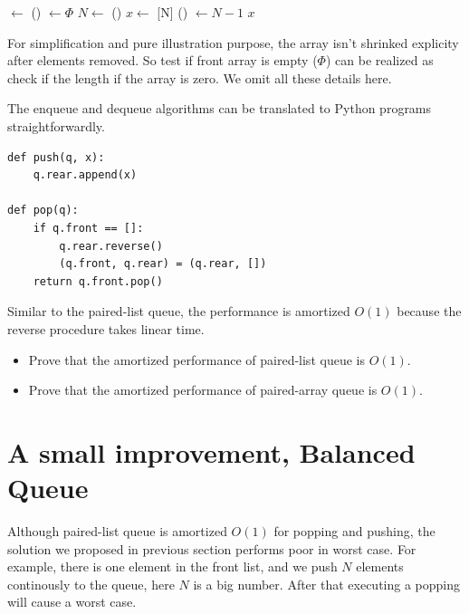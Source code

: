 \documentclass{article}
\begin{document}
\begin{algorithmic}
    \State {} $\gets$ ()
    \State {} $\gets \Phi$ 
  \EndIf
  \State $N \gets$ ()
  \State $x \gets$ [N]
  \State {}() $\gets N - 1$
  \State \Return $x$
\EndFunction
\end{algorithmic}

For simplification and pure illustration purpose, the array isn't shrinked
explicity after elements removed. So test if front array is empty ($\Phi$)
can be realized as check if the length if the array is zero. We omit all
these details here.

The enqueue and dequeue algorithms can be translated to Python programs
straightforwardly.

\begin{lstlisting}
def push(q, x):
    q.rear.append(x)

def pop(q):
    if q.front == []:
        q.rear.reverse()
        (q.front, q.rear) = (q.rear, [])
    return q.front.pop()
\end{lstlisting}

Similar to the paired-list queue, the performance is amortized $O(1)$
because the reverse procedure takes linear time.

\begin{Exercise}
\begin{itemize}
\item Prove that the amortized performance of paired-list queue is $O(1)$.
\item Prove that the amortized performance of paired-array queue is $O(1)$.
\end{itemize}
\end{Exercise}

\section{A small improvement, Balanced Queue}

Although paired-list queue is amortized $O(1)$ for popping and pushing,
the solution we proposed in previous section performs poor in worst case.
For example, there is one element in the front list, and we push $N$ elements
continously to the queue, here $N$ is a big number. After that executing
a popping will cause a worst case.
\end{document}
